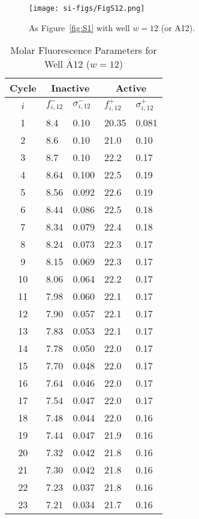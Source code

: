                 \begin{figure}
                    \centering
                    \texttt{[image: si-figs/FigS12.png]}
                    \caption{
                        As Figure~\ref{fig:S1} with well $w=12$ (or A12).
                    }
                \end{figure}
                \clearpage
    \begin{table}
        \caption{Molar Fluorescence Parameters for Well A12 ($w=12$)}
        \centering
        \begin{tabular}{c|ll|ll}
            Cycle & \multicolumn{2}{c|}{Inactive} & \multicolumn{2}{c}{Active} \\
            \hline
            $i$ & $f_{i,12}^{-}$ & $\sigma_{i,12}^{-}$ &  $f_{i,12}^{+}$ & $\sigma_{i,12}^{+}$ \\
            \hline
    1 & 8.4 & 0.10 & 20.35 & 0.081 \\
2 & 8.6 & 0.10 & 21.0 & 0.10 \\
3 & 8.7 & 0.10 & 22.2 & 0.17 \\
4 & 8.64 & 0.100 & 22.5 & 0.19 \\
5 & 8.56 & 0.092 & 22.6 & 0.19 \\
6 & 8.44 & 0.086 & 22.5 & 0.18 \\
7 & 8.34 & 0.079 & 22.4 & 0.18 \\
8 & 8.24 & 0.073 & 22.3 & 0.17 \\
9 & 8.15 & 0.069 & 22.3 & 0.17 \\
10 & 8.06 & 0.064 & 22.2 & 0.17 \\
11 & 7.98 & 0.060 & 22.1 & 0.17 \\
12 & 7.90 & 0.057 & 22.1 & 0.17 \\
13 & 7.83 & 0.053 & 22.1 & 0.17 \\
14 & 7.78 & 0.050 & 22.0 & 0.17 \\
15 & 7.70 & 0.048 & 22.0 & 0.17 \\
16 & 7.64 & 0.046 & 22.0 & 0.17 \\
17 & 7.54 & 0.047 & 22.0 & 0.17 \\
18 & 7.48 & 0.044 & 22.0 & 0.16 \\
19 & 7.44 & 0.047 & 21.9 & 0.16 \\
20 & 7.32 & 0.042 & 21.8 & 0.16 \\
21 & 7.30 & 0.042 & 21.8 & 0.16 \\
22 & 7.23 & 0.037 & 21.8 & 0.16 \\
23 & 7.21 & 0.034 & 21.7 & 0.16 \\

\end{tabular}
\end{table}
